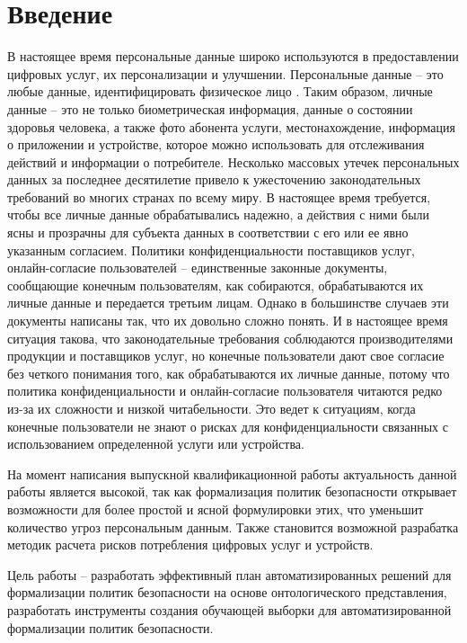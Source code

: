 \documentclass[../main]{subfiles}
\begin{document}
\newpage
{}
{}
\section*{Введение}

В настоящее время персональные данные широко используются в пре\-доставлении цифровых услуг, их персонализации и улучшении. Персональные данные -- это любые данные, идентифицировать физическое лицо \cite{GDPR}. Таким образом, личные данные -- это не только биометрическая информация, данные о состоянии здоровья человека, а также фото абонента услуги, местонахождение, информация о приложении и устройстве, которое можно использовать для отслеживания действий и информации о потребителе. Несколько массовых утечек персональных данных за последнее десятилетие привело к ужесточению законодательных требований во многих странах по всему миру. В настоящее время требуется, чтобы все личные данные обрабатывались надежно, а действия с ними были ясны и прозрачны для субъекта данных в соответствии с его или ее явно указанным согласием. Политики конфиденциальности поставщиков услуг, онлайн-согласие пользователей -- единственные законные документы, сообщающие конечным пользователям, как собираются, обрабатываются их личные данные и передается третьим лицам. Однако в большинстве случаев эти документы написаны так, что их довольно сложно понять. И в настоящее время ситуация такова, что законодательные требования  соблюдаются производителями продукции и поставщиков услуг, но конечные пользователи дают свое согласие без четкого понимания того, как обрабатываются их личные данные, потому что политика конфиденциальности и онлайн-согласие пользователя читаются редко из-за их сложности и низкой читабельности. Это ведет к ситуациям, когда конечные пользователи не знают о рисках для конфиденциальности связанных с использованием определенной услуги или устройства. 

На момент написания выпускной квалификационной работы актуальность данной работы является высокой, так как формализация политик безопасности открывает возможности для более простой и ясной формулировки этих, что уменьшит количество угроз персональным данным. Также становится возможной разрабатка методик расчета рисков потребления цифровых услуг и устройств.

Цель работы -- разработать эффективный план автоматизированных решений для формализации политик безопасности на основе онтологического представления, разработать инструменты создания обучающей выборки для автоматизированной формализации политик безопасности. 
\end{document}
